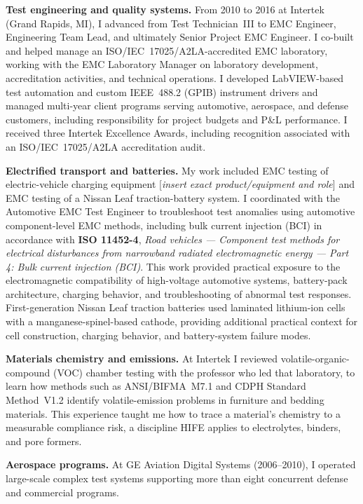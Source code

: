 \documentclass[11pt,letterpaper]{article}
\begin{document}
\textbf{Test engineering and quality systems.}
From 2010 to 2016 at Intertek (Grand Rapids, MI), I advanced from Test
Technician~III to EMC Engineer, Engineering Team Lead, and ultimately Senior
Project EMC Engineer. I co-built and helped manage an
ISO/IEC~17025/A2LA-accredited EMC laboratory, working with the EMC Laboratory
Manager on laboratory development, accreditation activities, and technical
operations. I developed LabVIEW-based test automation and custom IEEE~488.2
(GPIB) instrument drivers and managed multi-year client programs serving
automotive, aerospace, and defense customers, including responsibility for
project budgets and P\&L performance. I received three Intertek Excellence
Awards, including recognition associated with an ISO/IEC~17025/A2LA
accreditation audit.

\textbf{Electrified transport and batteries.}
My work included EMC testing of electric-vehicle charging equipment
[\textit{insert exact product/equipment and role}] and EMC testing of a
Nissan Leaf traction-battery system. I coordinated with the Automotive EMC
Test Engineer to troubleshoot test anomalies using automotive component-level
EMC methods, including bulk current injection (BCI) in accordance with
\textbf{ISO 11452-4}, \textit{Road vehicles --- Component test methods for
electrical disturbances from narrowband radiated electromagnetic energy ---
Part 4: Bulk current injection (BCI)}. This work provided practical exposure
to the electromagnetic compatibility of high-voltage automotive systems,
battery-pack architecture, charging behavior, and troubleshooting of
abnormal test responses. First-generation Nissan Leaf traction batteries
used laminated lithium-ion cells with a manganese-spinel-based cathode,
providing additional practical context for cell construction, charging
behavior, and battery-system failure modes.

\textbf{Materials chemistry and emissions.}
At Intertek I reviewed volatile-organic-compound (VOC) chamber testing with
the professor who led that laboratory, to learn how methods such as
ANSI/BIFMA~M7.1 and CDPH Standard Method~V1.2 identify volatile-emission
problems in furniture and bedding materials. This experience taught me how
to trace a material's chemistry to a measurable compliance risk, a
discipline HIFE applies to electrolytes, binders, and pore formers.

\textbf{Aerospace programs.}
At GE Aviation Digital Systems (2006--2010), I operated large-scale complex
test systems supporting more than eight concurrent defense and commercial
programs.
\end{document}
